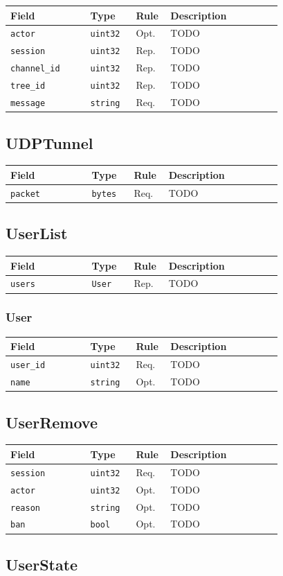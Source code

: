 \documentclass[11pt]{article} %
\newenvironment{mumbleMessageEx}
{%
	\small
	\renewcommand\arraystretch{1.5}
	\begin{tabular}{p{0.25\linewidth}p{0.13\linewidth}p{0.05\linewidth}p{0.35\linewidth}}
	Field & Type & Rule & Description \\
	\hline
}
{%
	\end{tabular}
	\renewcommand\arraystretch{1.0}
}
\newcommand{\mumbleMessageExItem}[4]{ \texttt{#1} & \texttt{#2} & #3 & #4 \\ }
\begin{document}
\begin{mumbleMessageEx}
\mumbleMessageExItem{actor}{uint32}{Opt.}{TODO}
\mumbleMessageExItem{session}{uint32}{Rep.}{TODO}
\mumbleMessageExItem{channel\_id}{uint32}{Rep.}{TODO}
\mumbleMessageExItem{tree\_id}{uint32}{Rep.}{TODO}
\mumbleMessageExItem{message}{string}{Req.}{TODO}
\end{mumbleMessageEx}

\subsection{UDPTunnel}

\begin{mumbleMessageEx}
\mumbleMessageExItem{packet}{bytes}{Req.}{TODO}
\end{mumbleMessageEx}

\subsection{UserList}

\begin{mumbleMessageEx}
\mumbleMessageExItem{users}{User}{Rep.}{TODO}
\end{mumbleMessageEx}

\subsubsection{User}

\begin{mumbleMessageEx}
\mumbleMessageExItem{user\_id}{uint32}{Req.}{TODO}
\mumbleMessageExItem{name}{string}{Opt.}{TODO}
\end{mumbleMessageEx}

\subsection{UserRemove}

\begin{mumbleMessageEx}
\mumbleMessageExItem{session}{uint32}{Req.}{TODO}
\mumbleMessageExItem{actor}{uint32}{Opt.}{TODO}
\mumbleMessageExItem{reason}{string}{Opt.}{TODO}
\mumbleMessageExItem{ban}{bool}{Opt.}{TODO}
\end{mumbleMessageEx}

\subsection{UserState}
\label{msg:userState}
\end{document}
